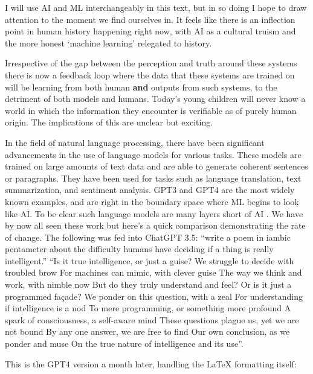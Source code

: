 I will use AI and ML interchangeably in this text, but in so doing I hope to draw attention to the moment we find ourselves in. It feels like there is an inflection point in human history happening right now, with AI as a cultural truism and the more honest `machine learning' relegated to history. \par
Irrespective of the gap between the perception and truth around these systems there is now a feedback loop where the data that these systems are trained on will be learning from both human \textbf{and} outputs from such systems, to the detriment of both models and humans\cite{shumailov2023curse}. Today's young children will never know a world in which the information they encounter is verifiable as of purely human origin. The implications of this are unclear but exciting. \par
In the field of natural language processing, there have been significant advancements in the use of language models for various tasks. These models are trained on large amounts of text data and are able to generate coherent sentences or paragraphs. They have been used for tasks such as language translation, text summarization, and sentiment analysis. GPT3 and GPT4 are the most widely known examples, and are right in the boundary space where ML begins to look like AI. To be clear such language models are many layers short of AI \cite{elkins2020can, marcus2020gpt}. We have by now all seen these work but here's a quick comparison demonstrating the rate of change. The following was fed into ChatGPT 3.5: ``write a poem in iambic pentameter about the difficulty humans have deciding if a thing is really intelligent.''
\newpage
[enhanced, frame style={fill=lightgray}, interior style={fill=lightgray}]``Is it true intelligence, or just a guise?
We struggle to decide with troubled brow
For machines can mimic, with clever guise
The way we think and work, with nimble now
But do they truly understand and feel?
Or is it just a programmed façade?
We ponder on this question, with a zeal
For understanding if intelligence is a nod
To mere programming, or something more profound
A spark of consciousness, a self-aware mind
These questions plague us, yet we are not bound
By any one answer, we are free to find
Our own conclusion, as we ponder and muse
On the true nature of intelligence and its use''.

This is the GPT4 version a month later, handling the LaTeX formatting itself:\\

